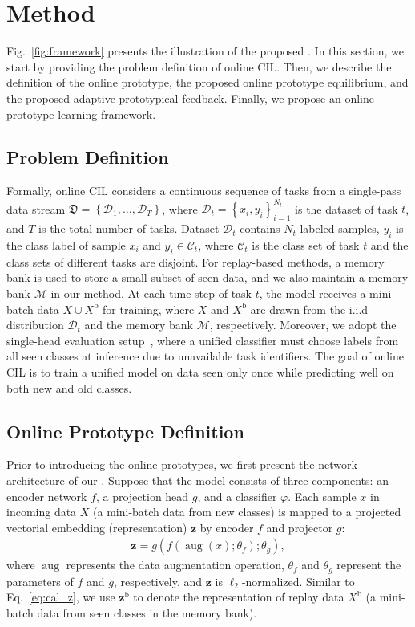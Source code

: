 \section{Method}
Fig.~\ref{fig:framework} presents the illustration of the proposed \frameworkName.
In this section,  
we start by providing the problem definition of online CIL. Then, we describe the definition of the online prototype, the proposed online prototype equilibrium, and the proposed adaptive prototypical feedback. Finally, we propose an online prototype learning framework.

\subsection{Problem Definition}
Formally, online CIL considers a continuous sequence of tasks from a single-pass data stream $\mathfrak{D}=\left\{\mathcal{D}_1, \ldots, \mathcal{D}_T \right\} $, where $\mathcal{D}_t = \left\{ x_{i}, y_{i} \right\} ^{N_t}_{i=1} $ is the dataset of task $t$, and $T$ is the total number of tasks. Dataset $\mathcal{D}_t$ contains $N_t$ labeled samples, $y_{i}$ is the class label of sample $x_{i}$ and $y_{i} \in \mathcal{C}_t$, where $\mathcal{C}_t$ is the class set of task $t$ and the class sets of different tasks are disjoint. 
For replay-based methods, a memory bank is used to store a small subset of seen data, and we also maintain a memory bank $\mathcal{M}$ in our method.
At each time step of task $t$, the model receives a mini-batch data $X \cup X^\mathrm{b}$ for training, where $X$ and $X^\mathrm{b}$ are drawn from the i.i.d distribution $\mathcal{D}_t$ and the memory bank $\mathcal{M}$, respectively. 
Moreover, we adopt the single-head evaluation setup~\cite{EWC}, where a unified classifier must choose labels from all seen classes at inference due to unavailable task identifiers. 
The goal of online CIL is to train a unified model on data seen only once while predicting well on both new and old classes.

\subsection{Online Prototype Definition}
Prior to introducing the online prototypes, we first present the network architecture of our \frameworkName. Suppose that the model consists of three components: an encoder network $f$, a projection head $g$, and a classifier $\varphi$. Each sample $x$ in incoming data $X$ (a mini-batch data from new classes) is mapped to a projected vectorial embedding (representation) $\mathbf{z}$ by encoder $f$ and projector $g$:
\begin{align}
\label{eq:cal_z}
    \mathbf{z} = g(f(\operatorname{aug}(x);\theta_f);\theta_g),
\end{align}
where $\operatorname{aug}$ represents the data augmentation operation, $\theta_f$ and $\theta_g$ represent the parameters of $f$ and $g$, respectively, and $\mathbf{z}$ is $\ell_2$-normalized. 
Similar to Eq.~\eqref{eq:cal_z}, we use $\mathbf{z}^\mathrm{b}$ to denote the representation of replay data $X^\mathrm{b}$ (a mini-batch data from seen classes in the memory bank). 

